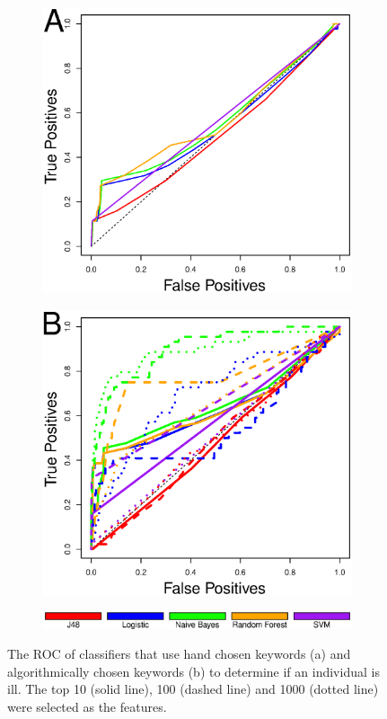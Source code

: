 \documentclass{sig-alternate-2013}
\begin{document}
\begin{figure} [h]
\centering
\begin{subfigure}[b]{.2\textwidth}
\includegraphics[width=\textwidth]{figs/key_exp_roc.eps}
\end{subfigure}
\begin{subfigure}[b]{.2\textwidth}
\includegraphics[width=\textwidth]{figs/key_dm_roc.eps}
\end{subfigure}
\begin{subfigure}[b]{.45\textwidth}
\includegraphics[width=\textwidth]{figs/keyword_legend.eps}
\end{subfigure}
\caption{The ROC of classifiers that use hand chosen keywords (a) and algorithmically chosen keywords (b) to determine if an individual is ill. The top 10 (solid line), 100 (dashed line) and 1000 (dotted line) were selected as the features.}
\label{fig:roc_keyword}
\end{figure}
\end{document}
